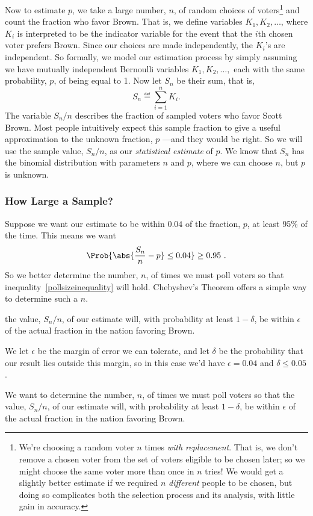 Now to estimate $p$, we take a large number, $n$, of random choices of
voters\footnote{We're choosing a random voter $n$ times \emph{with
    replacement}.  That is, we don't remove a chosen voter from the set of
  voters eligible to be chosen later; so we might choose the same voter
  more than once in $n$ tries!  We would get a slightly better estimate if
  we required $n$ \emph{different} people to be chosen, but doing so
  complicates both the selection process and its analysis, with little gain
  in accuracy.}  and count the fraction who favor Brown.  That is, we
define variables $K_1, K_2, \dots$, where $K_i$ is interpreted to be the
indicator variable for the event that the $i$th chosen voter prefers
Brown.  Since our choices are made independently, the $K_i$'s are
independent.  So formally, we model our estimation process by simply
assuming we have mutually independent Bernoulli variables $K_1, K_2,
\dots,$ each with the same probability, $p$, of being equal to 1.  Now let
$S_n$ be their sum, that is,
\begin{equation}\label{LN12:Sn}
S_n \eqdef \sum_{i=1}^n K_i.
\end{equation}
The variable $S_n/n$ describes the fraction of sampled voters who
favor Scott Brown.  Most people intuitively expect this sample
fraction to give a useful approximation to the unknown fraction, $p$
---and they would be right.  \iffalse Note that
\[
\expect{\frac{S_n}{n}} = \sum_{i=1}^n \expect{K_i} = pn.
\]
\fi So we will use the sample value, $S_n/n$, as our \emph{statistical
  estimate} of $p$.  We know that $S_n$ has the binomial distribution
with parameters $n$ and $p$, where we can choose $n$, but $p$ is 
unknown.

\subsubsection{How Large a Sample?}
Suppose we want our estimate to be within $0.04$ of the fraction, $p$,
at least 95\% of the time.  This means we want
\begin{equation}\label{pollsizeinequality}
\Prob{\abs{\frac{S_n}{n} - p} \leq 0.04} \geq 0.95\ .
\end{equation}
So we better determine the number, $n$, of times we must poll voters so
that inequality~\eqref{pollsizeinequality} will hold.  Chebyshev's
Theorem offers a simple way to determine such a $n$.

\begin{editingnotes}
the value, $S_n/n$, of our estimate will, with probability at least
$1 -\delta$, be within $\epsilon$ of the actual fraction in the nation
favoring Brown.

We let $\epsilon$ be the margin of error we can tolerate, and let $\delta$
be the probability that our result lies outside this margin, so in this
case we'd have $\epsilon = 0.04$ and $\delta \le 0.05$.

We want to determine the number, $n$, of times we must poll voters so that
the value, $S_n/n$, of our estimate will, with probability at least
$1 -\delta$, be within $\epsilon$ of the actual fraction in the nation
favoring Brown.
\end{editingnotes}

